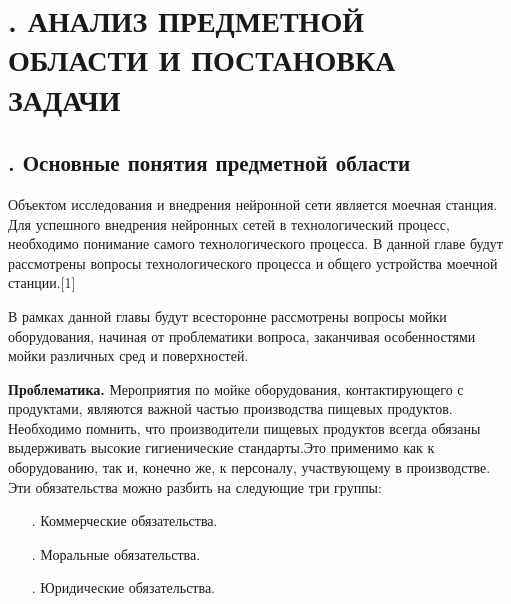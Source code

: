 \setcounter{chaptercntr}{1}

\sectionbreak \section*{
  \gostTitleFont
  \redline
  \thechaptercntr .
  АНАЛИЗ ПРЕДМЕТНОЙ ОБЛАСТИ И ПОСТАНОВКА ЗАДАЧИ
}

\titlespace

\subsection*{ 
  \gostTitleFont
  \redline
  \thechaptercntr .\thesubchaptercntr \spc 
  Основные понятия предметной области
} \addtocounter{subchaptercntr}{1}

\subtitlespace

{\gostFont

\par \redline Объектом исследования и внедрения нейронной сети является моечная станция. Для успешного внедрения нейронных сетей в технологический процесс, необходимо понимание самого технологического процесса. В данной главе будут рассмотрены вопросы технологического процесса и общего устройства моечной станции.[1] 

\par \redline В рамках данной главы будут всесторонне рассмотрены вопросы мойки оборудования, начиная от проблематики вопроса, заканчивая особенностями мойки различных сред и поверхностей.


\par \redline  \textbf{Проблематика.} Мероприятия по мойке оборудования, контактирующего с продуктами, являются важной частью производства пищевых продуктов. Необходимо помнить, что производители пищевых продуктов всегда обязаны выдерживать высокие гигиенические стандарты.Это применимо как к оборудованию, так и, конечно же, к персоналу, участвующему	в производстве. Эти обязательства можно разбить на следующие три группы:

\begin{itemize}[leftmargin=2.15cm, labelwidth=0.65cm, labelsep=0.0cm] 
	
	\item[\theitemcntr. ] Коммерческие обязательства.
	\addtocounter{itemcntr}{1}
	
	\item[\theitemcntr. ] Моральные обязательства.
	\addtocounter{itemcntr}{1}
	
	\item[\theitemcntr. ] Юридические обязательства.
	\addtocounter{itemcntr}{1}
	

\end{itemize}}
